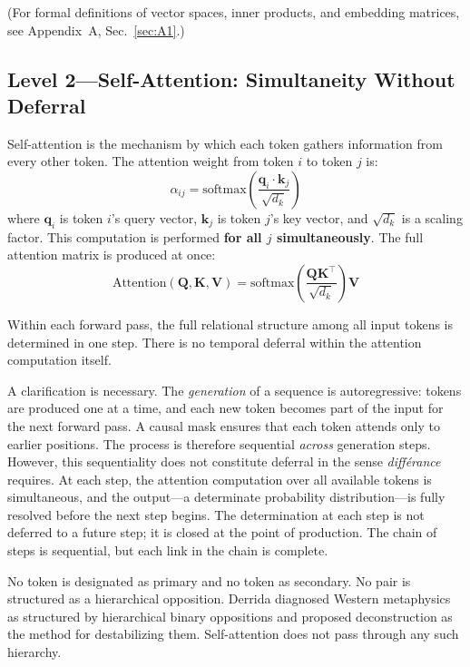 \documentclass[a4paper,twocolumn,11pt]{article}
\begin{document}
(For formal definitions of vector spaces, inner products, and embedding matrices, see Appendix~A, Sec.~\ref{sec:A1}.)

\subsection{Level 2---Self-Attention: Simultaneity Without Deferral}
\label{sec:attention}

Self-attention is the mechanism by which each token gathers information from every other token. The attention weight from token $i$ to token $j$ is:
\begin{equation}
\alpha_{ij} = \mathrm{softmax}\!\left(\frac{\mathbf{q}_i \cdot \mathbf{k}_j}{\sqrt{d_k}}\right)
\end{equation}
where $\mathbf{q}_i$ is token $i$'s query vector, $\mathbf{k}_j$ is token $j$'s key vector, and $\sqrt{d_k}$ is a scaling factor. This computation is performed \textbf{for all $j$ simultaneously}. The full attention matrix is produced at once:
\begin{equation}
\mathrm{Attention}(\mathbf{Q}, \mathbf{K}, \mathbf{V}) = \mathrm{softmax}\!\left(\frac{\mathbf{Q}\mathbf{K}^\top}{\sqrt{d_k}}\right)\mathbf{V}
\end{equation}

Within each forward pass, the full relational structure among all input tokens is determined in one step. There is no temporal deferral within the attention computation itself.

A clarification is necessary. The \emph{generation} of a sequence is autoregressive: tokens are produced one at a time, and each new token becomes part of the input for the next forward pass. A causal mask ensures that each token attends only to earlier positions. The process is therefore sequential \emph{across} generation steps. However, this sequentiality does not constitute deferral in the sense \emph{diff\'erance} requires. At each step, the attention computation over all available tokens is simultaneous, and the output---a determinate probability distribution---is fully resolved before the next step begins. The determination at each step is not deferred to a future step; it is closed at the point of production. The chain of steps is sequential, but each link in the chain is complete.

No token is designated as primary and no token as secondary. No pair is structured as a hierarchical opposition. Derrida diagnosed Western metaphysics as structured by hierarchical binary oppositions and proposed deconstruction as the method for destabilizing them. Self-attention does not pass through any such hierarchy.
\end{document}
